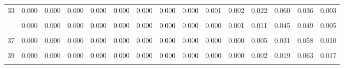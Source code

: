 \documentclass[
]{article}
\begin{document}
\begin{table}[!h]
{\begin{tabular}[t]{ccccccccccccccc}
33 & 0.000 & 0.000 & 0.000 & 0.000 & 0.000 & 0.000 & 0.000 & 0.000 & 0.001 & 0.002 & 0.022 & 0.060 & 0.036 & 0.003\\
\cellcolor{gray!10}{34} & \cellcolor{gray!10}{0.000} & \cellcolor{gray!10}{0.000} & \cellcolor{gray!10}{0.000} & \cellcolor{gray!10}{0.000} & \cellcolor{gray!10}{0.000} & \cellcolor{gray!10}{0.000} & \cellcolor{gray!10}{0.000} & \cellcolor{gray!10}{0.000} & \cellcolor{gray!10}{0.001} & \cellcolor{gray!10}{0.001} & \cellcolor{gray!10}{0.016} & \cellcolor{gray!10}{0.053} & \cellcolor{gray!10}{0.042} & \cellcolor{gray!10}{0.004}\\
\addlinespace
35 & 0.000 & 0.000 & 0.000 & 0.000 & 0.000 & 0.000 & 0.000 & 0.000 & 0.000 & 0.001 & 0.011 & 0.045 & 0.049 & 0.005\\
\cellcolor{gray!10}{36} & \cellcolor{gray!10}{0.000} & \cellcolor{gray!10}{0.000} & \cellcolor{gray!10}{0.000} & \cellcolor{gray!10}{0.000} & \cellcolor{gray!10}{0.000} & \cellcolor{gray!10}{0.000} & \cellcolor{gray!10}{0.000} & \cellcolor{gray!10}{0.000} & \cellcolor{gray!10}{0.000} & \cellcolor{gray!10}{0.000} & \cellcolor{gray!10}{0.008} & \cellcolor{gray!10}{0.038} & \cellcolor{gray!10}{0.054} & \cellcolor{gray!10}{0.008}\\
37 & 0.000 & 0.000 & 0.000 & 0.000 & 0.000 & 0.000 & 0.000 & 0.000 & 0.000 & 0.000 & 0.005 & 0.031 & 0.058 & 0.010\\
\cellcolor{gray!10}{38} & \cellcolor{gray!10}{0.000} & \cellcolor{gray!10}{0.000} & \cellcolor{gray!10}{0.000} & \cellcolor{gray!10}{0.000} & \cellcolor{gray!10}{0.000} & \cellcolor{gray!10}{0.000} & \cellcolor{gray!10}{0.000} & \cellcolor{gray!10}{0.000} & \cellcolor{gray!10}{0.000} & \cellcolor{gray!10}{0.000} & \cellcolor{gray!10}{0.004} & \cellcolor{gray!10}{0.024} & \cellcolor{gray!10}{0.061} & \cellcolor{gray!10}{0.013}\\
39 & 0.000 & 0.000 & 0.000 & 0.000 & 0.000 & 0.000 & 0.000 & 0.000 & 0.000 & 0.000 & 0.002 & 0.019 & 0.063 & 0.017\\
\addlinespace
\cellcolor{gray!10}{40} & \cellcolor{gray!10}{0.000} & \cellcolor{gray!10}{0.000} & \cellcolor{gray!10}{0.000} & \cellcolor{gray!10}{0.000} & \cellcolor{gray!10}{0.000} & \cellcolor{gray!10}{0.000} & \cellcolor{gray!10}{0.000} & \cellcolor{gray!10}{0.000} & \cellcolor{gray!10}{0.000} & \cellcolor{gray!10}{0.000} & \cellcolor{gray!10}{0.001} & \cellcolor{gray!10}{0.014} & \cellcolor{gray!10}{0.063} & \cellcolor{gray!10}{0.021}\\
\bottomrule
\end{tabular}}
\end{table}
\newpage
\end{document}
